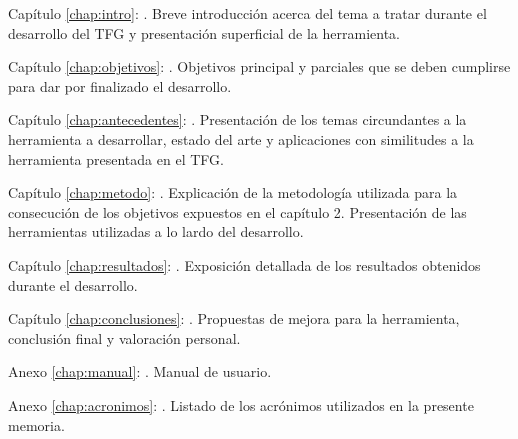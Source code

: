 \begin{definitionlist}
	\item[Capítulo \ref{chap:intro}: \nameref{chap:intro}.] Breve introducción acerca del tema a tratar durante el desarrollo del \ac{TFG} y presentación superficial de la herramienta.
	\item[Capítulo \ref{chap:objetivos}: \nameref{chap:objetivos}.] Objetivos principal y parciales que se deben cumplirse para dar por finalizado el desarrollo.
	\item[Capítulo \ref{chap:antecedentes}: \nameref{chap:antecedentes}.] Presentación de los temas circundantes a la herramienta a desarrollar, estado del arte y aplicaciones con similitudes a la herramienta presentada en el \ac{TFG}.
	\item[Capítulo \ref{chap:metodo}: \nameref{chap:metodo}.] Explicación de la metodología utilizada para la consecución de los objetivos expuestos en el capítulo 2. Presentación de las herramientas utilizadas a lo lardo del desarrollo.
	\item[Capítulo \ref{chap:resultados}: \nameref{chap:resultados}.] Exposición detallada de los resultados obtenidos durante el desarrollo.
	\item[Capítulo \ref{chap:conclusiones}: \nameref{chap:conclusiones}.] Propuestas de mejora para la herramienta, conclusión final y valoración personal.
	\item[Anexo \ref{chap:manual}: \nameref{chap:manual}.] Manual de usuario.
	\item[Anexo \ref{chap:acronimos}: \nameref{chap:acronimos}.] Listado de los acrónimos utilizados en la presente memoria.

	

\end{definitionlist}



